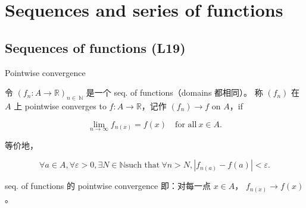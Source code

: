 \chapter{Sequences and series of functions}

\section{Sequences of functions (L19)}

\begin{definition}{Pointwise convergence}

令 \(\left( {f_{n}:A\rightarrow\mathbb{R}} \right)_{n \in \ \mathbb{N}}\) 是一个 seq. of functions（domains 都相同）。 称 \(\left( f_{n} \right)\) 在 \(A\) 上 pointwise converges to \(f:A\rightarrow\mathbb{R}\)，记作 \(\left( f_{n} \right)\rightarrow f\) on \(A\)，if

\[\lim\limits_{n\rightarrow\infty}f_{n{(x)}} = f(x)\quad\text{for all}\ x \in A.\]

等价地，

\[\forall a \in A,\forall\varepsilon > 0,\exists N \in \mathbb{N}\text{such that}\ \forall n > N,\left| {f_{n{(a)}} - f(a)} \right| < \varepsilon.\]

seq. of functions 的 pointwise convergence 即：对每一点 \(x \in A\)， \(f_{n{(x)}}\rightarrow f(x)\)。

\end{definition}

